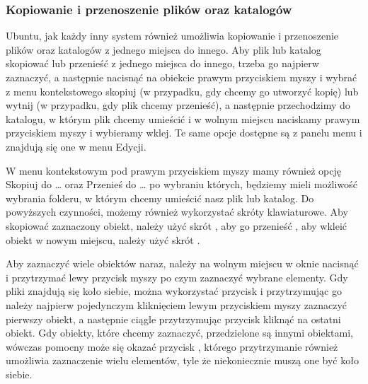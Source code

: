 \subsubsection{Kopiowanie i przenoszenie plików oraz katalogów}
Ubuntu, jak każdy inny system również umożliwia kopiowanie i przenoszenie plików oraz katalogów z jednego miejsca do innego. Aby plik lub katalog skopiować lub przenieść z jednego miejsca do innego, trzeba go najpierw zaznaczyć, a następnie nacisnąć na obiekcie prawym przyciskiem myszy i wybrać z menu kontekstowego skopiuj (w przypadku, gdy chcemy go utworzyć kopię) lub wytnij (w przypadku, gdy plik chcemy przenieść), a następnie przechodzimy do katalogu, w którym plik chcemy umieścić i w wolnym miejscu naciskamy prawym przyciskiem myszy i wybieramy wklej. Te same opcje dostępne są z panelu menu i znajdują się one w menu Edycji.

W menu kontekstowym pod prawym przyciskiem myszy mamy również opcję \textcolor{ubuntu_orange}{Skopiuj do \ldots} oraz \textcolor{ubuntu_orange}{Przenieś do \ldots} po wybraniu których, będziemy mieli możliwość wybrania folderu, w którym chcemy umieścić nasz plik lub katalog.
Do powyższych czynności, możemy również wykorzystać skróty klawiaturowe. Aby skopiować zaznaczony obiekt, należy użyć skrót , aby go przenieść , aby wkleić obiekt w nowym miejscu, należy użyć skrót .

Aby zaznaczyć wiele obiektów naraz, należy na wolnym miejscu w oknie nacisnąć i przytrzymać lewy przycisk myszy po czym zaznaczyć wybrane elementy. Gdy pliki znajdują się koło siebie, można wykorzystać przycisk  i przytrzymując go należy najpierw pojedynczym kliknięciem lewym przyciskiem myszy zaznaczyć pierwszy obiekt, a następnie ciągle przytrzymując przycisk  kliknąć na ostatni obiekt. Gdy obiekty, które chcemy zaznaczyć, przedzielone są innymi obiektami, wówczas pomocny może się okazać przycisk , którego przytrzymanie również umożliwia zaznaczenie wielu elementów, tyle że niekoniecznie muszą one być koło siebie.

